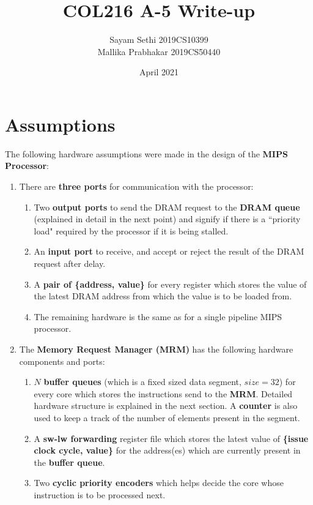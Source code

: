 \documentclass{article}
\title{COL216 A-5 Write-up}
\author{Sayam Sethi 2019CS10399 \\ Mallika Prabhakar 2019CS50440}
\date{April 2021}
\begin{document}

\maketitle
\section{Assumptions}
The following hardware assumptions were made in the design of the \textbf{MIPS Processor}:
\begin{enumerate}
    \item There are \textbf{three ports} for communication with the processor:
        \begin{enumerate}
            \item Two \textbf{output ports} to send the DRAM request to the \textbf{DRAM queue} (explained in detail in the next point) and signify if there is a ``priority load" required by the processor if it is being stalled.
            \item An \textbf{input port} to receive, and accept or reject the result of the DRAM request after delay.
            \item A \textbf{pair of \{address, value\}} for every register which stores the value of the latest DRAM address from which the value is to be loaded from.
            \item The remaining hardware is the same as for a single pipeline MIPS processor.
        \end{enumerate}
    \item The \textbf{Memory Request Manager (MRM)} has the following hardware components and ports:
        \begin{enumerate}
            \item $N$ \textbf{buffer queues} (which is a fixed sized data segment, $size = 32$) for every core which stores the instructions send to the \textbf{MRM}. Detailed hardware structure is explained in the next section. A \textbf{counter} is also used to keep a track of the number of elements present in the segment.
            \item A \textbf{sw-lw forwarding} register file which stores the latest value of \textbf{\{issue clock cycle, value\}} for the address(es) which are currently present in the \textbf{buffer queue}.
            \item Two \textbf{cyclic priority encoders} which helps decide the core whose instruction is to be processed next.

\end{enumerate}
\end{enumerate}
\end{document}
